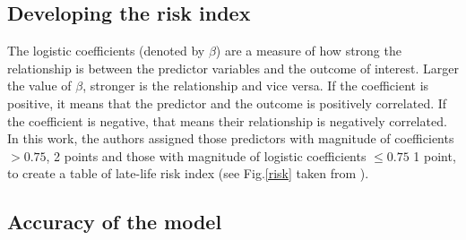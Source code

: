 \documentclass[12pt,letterpaper]{article}
\begin{document}
\subsection{Developing the risk index}

The logistic coefficients (denoted by $\beta$) are a measure of how strong the relationship is between the predictor variables and the outcome of interest. Larger the value of $\beta$, stronger is the relationship and vice versa. If the coefficient is positive, it means that the predictor and the outcome is positively correlated. If the coefficient is negative, that means their relationship is negatively correlated. In this work, the authors assigned those predictors with magnitude of coefficients $>0.75$, 2 points and those with magnitude of logistic coefficients $\leq0.75$ 1 point, to create a table of late-life risk index (see Fig.\ref{risk} taken from \cite{barnes2009}).

\subsection{Accuracy of the model}
\end{document}
